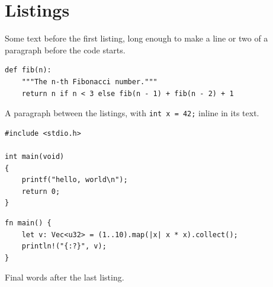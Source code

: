 \documentclass{article}
\begin{document}
\section{Listings}
Some text before the first listing, long enough to make a line or two
of a paragraph before the code starts.
\begin{verbatim}
def fib(n):
    """The n-th Fibonacci number."""
    return n if n < 3 else fib(n - 1) + fib(n - 2) + 1
\end{verbatim}
A paragraph between the listings, with \texttt{int x = 42;}
inline in its text.
\begin{verbatim}
#include <stdio.h>

int main(void)
{
    printf("hello, world\n");
    return 0;
}
\end{verbatim}
\begin{verbatim}
fn main() {
    let v: Vec<u32> = (1..10).map(|x| x * x).collect();
    println!("{:?}", v);
}
\end{verbatim}
Final words after the last listing.
\end{document}
